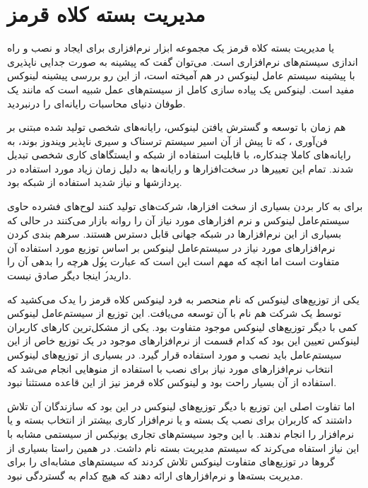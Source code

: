 

\section{مدیریت بسته کلاه قرمز}


 یا مدیریت بسته کلاه قرمز یک
مجموعه ابزار نرم‌افزاری برای ایجاد و نصب و راه اندازی سیستم‌های نرم‌افزاری است. می‌توان
گفت که پیشینه  به صورت جدایی ناپذیری با پیشینه سیستم عامل لینوکس در هم
آمیخته است، از این رو بررسی پیشینه‌ لینوکس مفید است. لینوکس یک پیاده سازی کامل
از سیستم‌های عمل شبیه  است که مانند یک طوفان دنیای محاسبات رایانه‌ای را
درنبردید.

هم زمان با توسعه و گسترش یافتن لینوکس، رایانه‌های شخصی تولید شده مبتنی بر
فن‌آوری ، که تا پیش از آن اسیر سیستم ترسناک و سیری ناپذیر ویندوز بوند،
به رایانه‌های کاملا چندکاره، با قابلیت استفاده
از شبکه و ایستگاهای کاری شخصی تبدیل شدند. تمام این تعییرها در سخت‌افزارها و
رایانه‌ها به دلیل زمان زیاد مورد استفاده در پردازشها و نیاز شدید استفاده از شبکه
بود.

برای به کار بردن بسیاری از سخت افزارها، شرکت‌های تولید کنند لوح‌های فشرده حاوی
سیستم‌عامل لینوکس و نرم افزارهای مورد نیاز آن را روانه بازار می‌کنند در حالی که
بسیاری از این نرم‌افزارها در شبکه جهانی قابل دسترس هستند.
سرهم بندی کردن نرم‌افزارهای مورد نیاز در سیستم‌عامل لینوکس بر اساس توزیع مورد
استفاده آن متفاوت است اما انچه که مهم است این است که عبارت \'پول هرچه را بدهی
آن را داری\' در اینجا دیگر صادق نیست.

یکی از توزیع‌های لینوکس که نام منحصر به فرد لینوکس کلاه قرمز را یدک می‌کشید که توسط یک شرکت هم نام با آن توسعه می‌یافت. این توزیع
از سیستم‌عامل لینوکس کمی با دیگر توزیع‌های لینوکس موجود متفاوت بود. یکی از
مشکل‌ترین کارهای کاربران لینوکس تعیین این بود که کدام قسمت از نرم‌افزارهای موجود
در یک توزیع خاص از این سیستم‌عامل باید نصب و مورد استفاده قرار گیرد. در بسیاری
از توزیع‌های لینوکس انتخاب نرم‌افزارهای مورد نیاز برای نصب با استفاده از منوهایی
انجام می‌شد که استفاده از آن بسیار راحت بود و لینوکس کلاه قرمز نیز از این قاعده
مستثنا نبود.

اما تفاوت اصلی این توزیع با دیگر توزیع‌های لینوکس در این بود که سازندگان آن تلاش
داشتند که کاربران برای نصب یک بسته و یا نرم‌افزار کاری بیشتر از انتخاب بسته و یا
نرم‌افزار را انجام ندهند. با این وجود سیستم‌های تجاری یونیکس از سیستمی مشابه با
این نیاز استفاه می‌کرند که سیستم مدیریت بسته نام
داشت. در همین راستا بسیاری از گروها در توزیع‌های متفاوت لینوکس تلاش کردند که
سیستم‌های مشابه‌ای را برای مدیریت بسته‌ها و نرم‌افزارهای ارائه دهند که هیچ کدام
به گستردگی  نبود.

